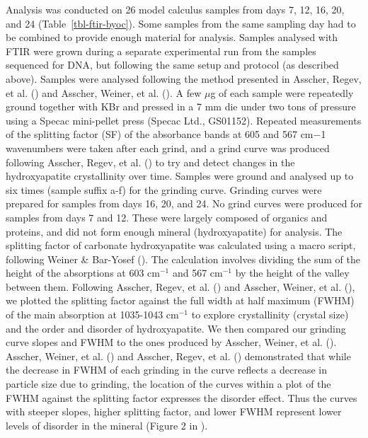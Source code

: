 \documentclass[
  b5paper,
]{book}
\begin{document}
Analysis was conducted on 26 model calculus samples from days 7, 12, 16,
20, and 24 (Table~\ref{tbl-ftir-byoc}). Some samples from the same
sampling day had to be combined to provide enough material for analysis.
Samples analysed with FTIR were grown during a separate experimental run
from the samples sequenced for DNA, but following the same setup and
protocol (as described above). Samples were analysed following the
method presented in Asscher, Regev, et al.
() and Asscher, Weiner, et
al. (). A few \(\mu\)g
of each sample were repeatedly ground together with KBr and pressed in a
7 mm die under two tons of pressure using a Specac mini-pellet press
(Specac Ltd., GS01152). Repeated measurements of the splitting factor
(SF) of the absorbance bands at 605 and 567 cm−1 wavenumbers were taken
after each grind, and a grind curve was produced following Asscher,
Regev, et al. () to try
and detect changes in the hydroxyapatite crystallinity over time.
Samples were ground and analysed up to six times (sample suffix a-f) for
the grinding curve. Grinding curves were prepared for samples from days
16, 20, and 24. No grind curves were produced for samples from days 7
and 12. These were largely composed of organics and proteins, and did
not form enough mineral (hydroxyapatite) for analysis. The splitting
factor of carbonate hydroxyapatite was calculated using a macro script,
following Weiner \& Bar-Yosef
(). The calculation
involves dividing the sum of the height of the absorptions at 603
cm\(^{-1}\) and 567 cm\(^{-1}\) by the height of the valley between
them. Following Asscher, Regev, et al.
() and Asscher, Weiner, et
al. (), we plotted the
splitting factor against the full width at half maximum (FWHM) of the
main absorption at 1035-1043 cm\(^{-1}\) to explore crystallinity
(crystal size) and the order and disorder of hydroxyapatite. We then
compared our grinding curve slopes and FWHM to the ones produced by
Asscher, Weiner, et al.
(). Asscher, Weiner, et
al. () and Asscher,
Regev, et al. ()
demonstrated that while the decrease in FWHM of each grinding in the
curve reflects a decrease in particle size due to grinding, the location
of the curves within a plot of the FWHM against the splitting factor
expresses the disorder effect. Thus the curves with steeper slopes,
higher splitting factor, and lower FWHM represent lower levels of
disorder in the mineral (Figure 2 in
).
\end{document}
